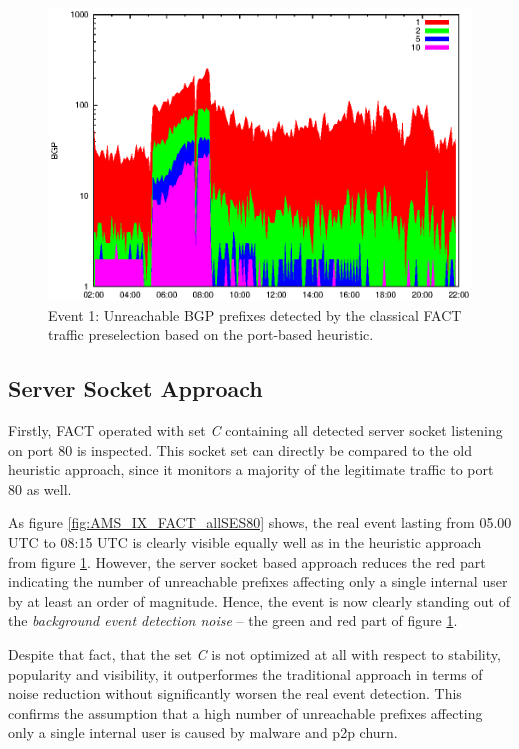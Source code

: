 \begin{figure}
	[p] \centering 
	\includegraphics[width=0.75\linewidth]{images/events/2010_03_25/bgp_log_port80_ref.eps}
	\caption{Event 1: Unreachable BGP prefixes detected by the classical FACT traffic preselection based on the port-based heuristic.} 
	\label{fig:AMS_IX_FACT_REF} 
\end{figure}

\subsection{Server Socket Approach}

Firstly, FACT operated with set \emph{C} containing all detected server socket 
listening on port 80 is inspected. This socket set can directly be compared to 
the old heuristic approach, since it monitors a majority of the legitimate 
traffic to port 80 as well. 

As figure \ref{fig:AMS_IX_FACT_allSES80} shows, the real event lasting from 
05.00 UTC to 08:15 UTC is clearly visible equally well as in the heuristic 
approach from figure \ref{fig:AMS_IX_FACT_REF}. However, the server socket based 
approach reduces the red part indicating the number of unreachable prefixes 
affecting only a single internal user by at least an order of magnitude. Hence,  
the event is now clearly standing out of the \emph{background event detection 
noise} -- the green and red part of figure \ref{fig:AMS_IX_FACT_REF}. 

Despite that fact, that the set \emph{C} is not optimized at all with respect to 
stability, popularity and visibility, it outperformes the traditional approach 
in terms of noise reduction without significantly worsen the real event 
detection. This confirms the assumption that a high number of unreachable 
prefixes affecting only a single internal user is caused by malware and p2p 
churn.

